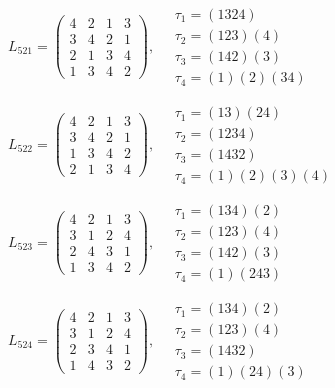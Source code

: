 $L_{521} = \begin{pmatrix} 4 & 2 & 1 & 3 \\ 3 & 4 & 2 & 1 \\ 2 & 1 & 3 & 4 \\ 1 & 3 & 4 & 2 \end{pmatrix}, \quad \begin{matrix} \tau_{1} = (1 3 2 4) \\ \tau_{2} = (1 2 3)(4) \\ \tau_{3} = (1 4 2)(3) \\ \tau_{4} = (1)(2)(3 4) \end{matrix}$

$L_{522} = \begin{pmatrix} 4 & 2 & 1 & 3 \\ 3 & 4 & 2 & 1 \\ 1 & 3 & 4 & 2 \\ 2 & 1 & 3 & 4 \end{pmatrix}, \quad \begin{matrix} \tau_{1} = (1 3)(2 4) \\ \tau_{2} = (1 2 3 4) \\ \tau_{3} = (1 4 3 2) \\ \tau_{4} = (1)(2)(3)(4) \end{matrix}$

$L_{523} = \begin{pmatrix} 4 & 2 & 1 & 3 \\ 3 & 1 & 2 & 4 \\ 2 & 4 & 3 & 1 \\ 1 & 3 & 4 & 2 \end{pmatrix}, \quad \begin{matrix} \tau_{1} = (1 3 4)(2) \\ \tau_{2} = (1 2 3)(4) \\ \tau_{3} = (1 4 2)(3) \\ \tau_{4} = (1)(2 4 3) \end{matrix}$

$L_{524} = \begin{pmatrix} 4 & 2 & 1 & 3 \\ 3 & 1 & 2 & 4 \\ 2 & 3 & 4 & 1 \\ 1 & 4 & 3 & 2 \end{pmatrix}, \quad \begin{matrix} \tau_{1} = (1 3 4)(2) \\ \tau_{2} = (1 2 3)(4) \\ \tau_{3} = (1 4 3 2) \\ \tau_{4} = (1)(2 4)(3) \end{matrix}$

